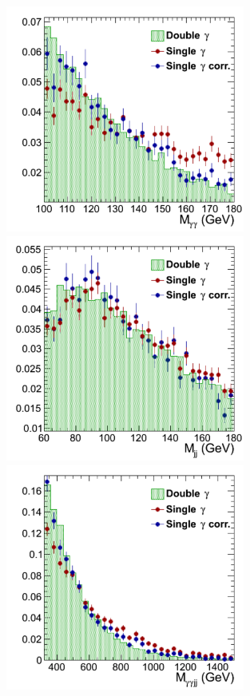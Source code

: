 \begin{figure}[ht]
 \begin{center}
   \includegraphics[width=0.70\textwidth]{figures/selection/mggSpectrum.pdf}
   \includegraphics[width=0.70\textwidth]{figures/selection/mjjSpectrum.pdf}
   \includegraphics[width=0.70\textwidth]{figures/selection/mggjjSpectrum.pdf}

\end{center}
\end{figure}
